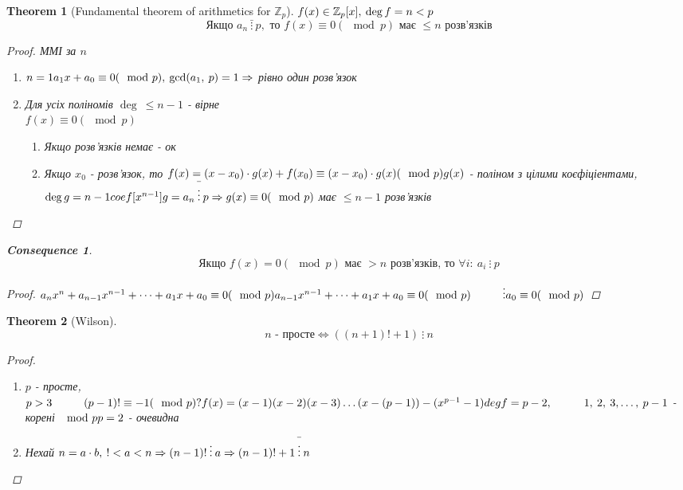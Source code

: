 \documentclass[a4paper,12pt, centered]{bookest}
\newtheorem{theorem}{Theorem}[section]
\newtheorem*{cons*}{Consequence}
\newcommand\tab[1][1cm]{\hspace*{#1}}
\begin{document}
\begin{theorem}[Fundamental theorem of arithmetics for $\mathbb{Z}_p$]
	$\\f(x)\in\mathbb{Z}_p[x],\>\deg f=n<p$
	$$\textrm{Якщо }a_n\>\bar{\vdots}\>p,\textrm{ то } f(x)\equiv0(\mod p)\textrm{ має }\leq n\textrm{ розв'язків}$$
	\begin{proof}ММІ за $n$
		\begin{enumerate}
			\item $n=1\\a_1x+a_0\equiv0(\mod p),\>\gcd(a_1,\>p)=1\Rightarrow$ рівно один розв'язок
			\item Для усіх поліномів $\deg\>\leq n-1$ - вірне \\ $f(x)\equiv0(\mod p)$
			\begin{enumerate} 
				\item Якщо розв'язків немає - ок
				\item Якщо $x_0$ - розв'язок, то $\\f(x)=(x-x_0)\cdot g(x)+f(x_0)\equiv(x-x_0)\cdot g(x)(\mod p)\\g(x)$ - поліном з цілими коєфіціентами, $\deg g=n-1\\ coef[x^{n-1}]g=a_n\>\bar{\vdots}\>p\Rightarrow g(x)\equiv0(\mod p)$ має $\leq n-1$ розв'язків
			\end{enumerate}
		\end{enumerate}
	\end{proof}
	\begin{cons*}
		$$\textrm{Якщо }f(x)=0(\mod p)\textrm{ має }>n\textrm{ розв'язків, то }\forall i:\>a_i\>\vdots\>p$$
		\begin{proof}$\\
			a_nx^n+a_{n-1}x^{n-1}+\dots+a_1x+a_0\equiv0(\mod p)\\
			a_{n-1}x^{n-1}+\dots+a_1x+a_0\equiv0(\mod p)\\
			\tab\vdots\\a_0\equiv 0(\mod p)$
		\end{proof}
	\end{cons*}
\end{theorem}
\begin{theorem}[Wilson]
$$n \textrm{ - просте}\Leftrightarrow((n+1)!+1)\>\vdots\>n$$
	\begin{proof}$ $
		\begin{enumerate}
			\item $p$ - просте, $p>3\tab (p-1)!\equiv-1(\mod p)?\\f(x)=(x-1)(x-2)(x-3)\dots(x-(p-1))-(x^{p-1}-1)\\deg f=p-2,\tab 1,\>2,\>3,\dots,\>p-1$ - корені $\mod p\\p=2$ - очевидна
			\item Нехай $n=a\cdot b,\>!<a<n\Rightarrow(n-1)!\>\vdots\>a\\\Rightarrow(n-1)!+1\>\bar{\vdots}\>n$
		\end{enumerate}
	\end{proof}
\end{theorem}
\end{document}
